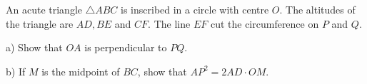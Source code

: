An acute triangle $\triangle{ABC}$ is inscribed in a circle with centre $O$. The altitudes of the triangle are $AD,BE$ and $CF$. The line $EF$ cut the circumference on $P$ and $Q$.

a) Show that $OA$ is perpendicular to $PQ$.

b) If $M$ is the midpoint of $BC$,  show that $AP^2=2AD\cdot{OM}$.